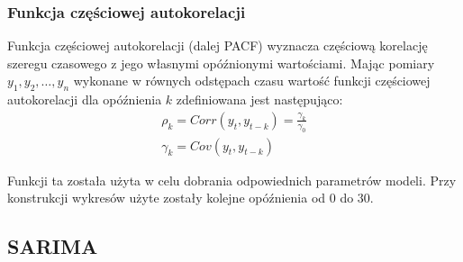 \documentclass[12pt]{article}
\begin{document}
\subsubsection{Funkcja częściowej autokorelacji}

Funkcja częściowej autokorelacji (dalej PACF) wyznacza częściową korelację szeregu czasowego z jego własnymi opóźnionymi wartościami. Mając pomiary $y_1, y_2, \dots, y_n$ wykonane w równych odstępach czasu wartość funkcji częściowej autokorelacji dla opóźnienia $k$ zdefiniowana jest następująco:
\begin{gather*}
    \rho_k = Corr(y_t, y_{t - k}) = \frac{\gamma_k}{\gamma_0} \\
    \gamma_k = Cov(y_t, y_{t - k})
\end{gather*}

Funkcji ta została użyta w celu dobrania odpowiednich parametrów modeli. Przy konstrukcji wykresów użyte zostały kolejne opóźnienia od $0$ do $30$.

\subsection{SARIMA}
\end{document}
